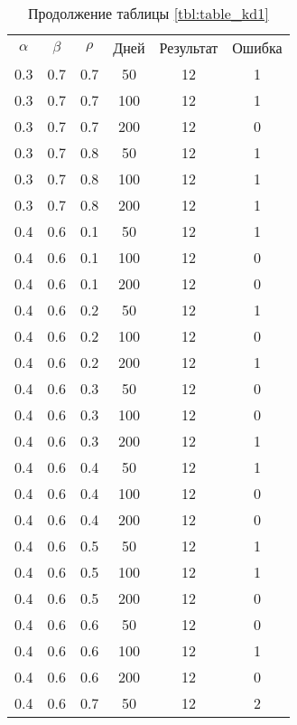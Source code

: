 \begin{table}[h]
	\begin{center}
        \captionsetup{justification=raggedright,singlelinecheck=off}
		\caption*{Продолжение таблицы \ref{tbl:table_kd1}}
		\begin{tabular}{|c|c|c|c|c|c|}
  	\hline
	$\alpha$ & $\beta$ & $\rho$ & Дней & Результат & Ошибка \\
 
	0.3 &  0.7 &  0.7 &   50 &    12 &     1 \\
	0.3 &  0.7 &  0.7 &  100 &    12 &     1 \\
	0.3 &  0.7 &  0.7 &  200 &    12 &     0 \\
   \hline
	0.3 &  0.7 &  0.8 &   50 &    12 &     1 \\
	0.3 &  0.7 &  0.8 &  100 &    12 &     1 \\
	0.3 &  0.7 &  0.8 &  200 &    12 &     1 \\
   \hline
	0.4 &  0.6 &  0.1 &   50 &    12 &     1 \\
	0.4 &  0.6 &  0.1 &  100 &    12 &     0 \\
	0.4 &  0.6 &  0.1 &  200 &    12 &     0 \\
   \hline
	0.4 &  0.6 &  0.2 &   50 &    12 &     1 \\
	0.4 &  0.6 &  0.2 &  100 &    12 &     0 \\
	0.4 &  0.6 &  0.2 &  200 &    12 &     1 \\
   \hline
	0.4 &  0.6 &  0.3 &   50 &    12 &     0 \\
	0.4 &  0.6 &  0.3 &  100 &    12 &     0 \\
	0.4 &  0.6 &  0.3 &  200 &    12 &     1 \\
   \hline
	0.4 &  0.6 &  0.4 &   50 &    12 &     1 \\
	0.4 &  0.6 &  0.4 &  100 &    12 &     0 \\
	0.4 &  0.6 &  0.4 &  200 &    12 &     0 \\
   \hline
	0.4 &  0.6 &  0.5 &   50 &    12 &     1 \\
	0.4 &  0.6 &  0.5 &  100 &    12 &     1 \\
	0.4 &  0.6 &  0.5 &  200 &    12 &     0 \\
   \hline
	0.4 &  0.6 &  0.6 &   50 &    12 &     0 \\
	0.4 &  0.6 &  0.6 &  100 &    12 &     1 \\
	0.4 &  0.6 &  0.6 &  200 &    12 &     0 \\
   \hline
	0.4 &  0.6 &  0.7 &   50 &    12 &     2 \\

\end{tabular}
\end{center}
\end{table}
